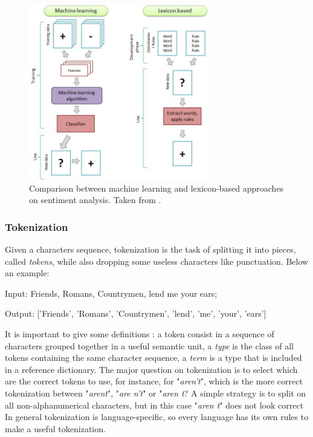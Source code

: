 \begin{figure}[ht]
	\centering
	\includegraphics[width=0.7\textwidth]{figures/Machine-learning-and-lexicon-based-approaches-to-sentiment-analysis.jpg}
	\caption{Comparison between machine learning and lexicon-based approaches on sentiment analysis. Taken from \cite{figure-comparative}.}
	\label{fig:mllbapp}
\end{figure}

\subsubsection{Tokenization}
Given a characters sequence, tokenization is the task of splitting it into pieces, called \textit{tokens}, while also dropping some useless characters like punctuation. Below an example:
\begin{description}
\item Input: Friends, Romans, Countrymen, lend me your ears;
\item Output: ['Friends', 'Romans', 'Countrymen', 'lend', 'me', 'your', 'ears']
\end{description}
It is important to give some definitions \cite{Manning:2008:IIR:1394399}: a token consist in a sequence of characters grouped together in a useful semantic unit, a \textit{type} is the class of all tokens containing the same character sequence, a \textit{term} is a type that is included in a reference dictionary. The major question on tokenization is to select which are the correct tokens to use, for instance, for "\textit{aren't}", which is the more correct tokenization between "\textit{arent}", "\textit{are n't}" or "\textit{aren t}? A simple strategy is to split on all non-alphanumerical characters, but in this case "\textit{aren t}" does not look correct
In general tokenization is language-specific, so every language has its own rules to make a useful tokenization.

